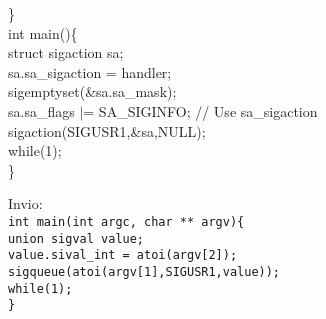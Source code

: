 \begin{flushleft}
\begin{flushleft}
\begin{flushleft}
{              \}\\
              int main()\{\\
              \halftab struct sigaction sa;\\
              \halftab sa.sa\_sigaction = handler;\\
              \halftab sigemptyset(\&sa.sa\_mask); \\
              \halftab sa.sa\_flags $|$= SA\_SIGINFO; // Use sa\_sigaction\\
              \halftab sigaction(SIGUSR1,\&sa,NULL);\\
              \halftab while(1);\\
              \}}
    \end{flushleft}
    \begin{flushleft}
      Invio: \\
      \texttt{int main(int argc, char ** argv)\{\\
        \halftab union sigval value;\\
        \halftab value.sival\_int = atoi(argv[2]); \\
        \halftab sigqueue(atoi(argv[1],SIGUSR1,value));\\
        \halftab while(1);\\
        \}}
    \end{flushleft}
  \end{flushleft}
\end{flushleft}